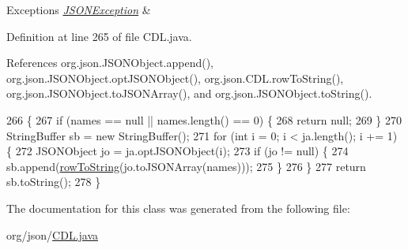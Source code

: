 \begin{DoxyExceptions}{Exceptions}
{\em \hyperlink{classorg_1_1json_1_1_j_s_o_n_exception}{J\-S\-O\-N\-Exception}} & \\
\hline
\end{DoxyExceptions}


Definition at line 265 of file C\-D\-L.\-java.



References org.\-json.\-J\-S\-O\-N\-Object.\-append(), org.\-json.\-J\-S\-O\-N\-Object.\-opt\-J\-S\-O\-N\-Object(), org.\-json.\-C\-D\-L.\-row\-To\-String(), org.\-json.\-J\-S\-O\-N\-Object.\-to\-J\-S\-O\-N\-Array(), and org.\-json.\-J\-S\-O\-N\-Object.\-to\-String().


\begin{DoxyCode}
266                                  \{
267         \textcolor{keywordflow}{if} (names == null || names.length() == 0) \{
268             \textcolor{keywordflow}{return} null;
269         \}
270         StringBuffer sb = \textcolor{keyword}{new} StringBuffer();
271         \textcolor{keywordflow}{for} (\textcolor{keywordtype}{int} i = 0; i < ja.length(); i += 1) \{
272             JSONObject jo = ja.optJSONObject(i);
273             \textcolor{keywordflow}{if} (jo != null) \{
274                 sb.append(\hyperlink{classorg_1_1json_1_1_c_d_l_ad428294b24ca60b441e60fa6b7b168bc}{rowToString}(jo.toJSONArray(names)));
275             \}
276         \}
277         \textcolor{keywordflow}{return} sb.toString();
278     \}
\end{DoxyCode}


The documentation for this class was generated from the following file\-:\begin{DoxyCompactItemize}
\item 
org/json/\hyperlink{_c_d_l_8java}{C\-D\-L.\-java}\end{DoxyCompactItemize}
